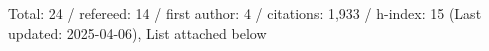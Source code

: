 Total: 24 / refereed: 14 / first author: 4 / citations: 1,933 / h-index: 15 (Last updated: 2025-04-06), List attached below